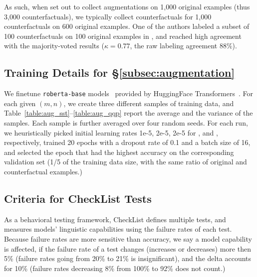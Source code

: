 As such, when set out to collect augmentations on 1,000 original examples (thus 3,000 counterfactuals), we typically collect counterfactuals for 1,000 counterfactuals on 600 original examples.
One of the authors labeled a subset of 100 counterfactuals on 100 original examples in \sst, and reached high agreement with the majority-voted results ($\kappa=0.77$, the raw labeling agreement $88\%$).


\subsection{Training Details for \S\ref{subsec:augmentation}}
\label{appendix:data_collection}

We finetune \texttt{roberta-base} models~\cite{liu2019roberta} provided by HuggingFace Transformers~\cite{Wolf2019HuggingFacesTS}.
For each given $(m,n)$, we create three different samples of training data, and Table~\ref{table:aug_sst}--\ref{table:aug_qqp} report the average and the variance of the samples.
Each sample is further averaged over four random seeds.
For each run, we heuristically picked initial learning rates 1e-5, 2e-5, 2e-5 for \sst, \nli and \qqp, respectively, trained 20 epochs with a dropout rate of 0.1 and a batch size of 16, and selected the epoch that had the highest accuracy on the corresponding validation set (1/5 of the training data size, with the same ratio of original and counterfactual examples.)


\subsection{Criteria for CheckList Tests}
\label{appendix:checklist}
As a behavioral testing framework, CheckList defines multiple tests, and measures models' linguistic capabilities using the failure rates of each test.
Because failure rates are more sensitive than accuracy, we say a model capability is affected, if the failure rate of a test changes (increases or decreases) more then 5\% (\eg failure rates going from 20\% to 21\% is insignificant), and the delta accounts for 10\% (\eg failure rates decreasing 8\% from 100\% to 92\% does not count.)


